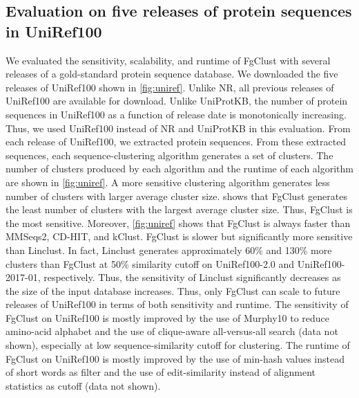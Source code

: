 \documentclass[11pt,letterpaper]{article}
\begin{document}
\subsection{Evaluation on five releases of protein sequences in UniRef100}

We evaluated the sensitivity, scalability, and runtime of FgClust with several releases of a gold-standard protein sequence database.
We downloaded the five releases of UniRef100 \citep{suzek2007uniref} shown in \cref{fig:uniref}.
Unlike NR, all previous releases of UniRef100 are available for download.
Unlike UniProtKB, the number of protein sequences in UniRef100 as a function of release date is monotonically increasing.
Thus, we used UniRef100 instead of NR and UniProtKB in this evaluation.
From each release of UniRef100, we extracted protein sequences.
From these extracted sequences, each sequence-clustering algorithm generates a set of clusters.
The number of clusters produced by each algorithm and the runtime of each algorithm are shown in \cref{fig:uniref}.
A more sensitive clustering algorithm generates less number of clusters with larger average cluster size.
 shows that FgClust generates the least number of clusters with the largest average cluster size.
Thus, FgClust is the most sensitive.
Moreover, \cref{fig:uniref} shows that FgClust is always faster than MMSeqs2, CD-HIT, and kClust.
FgClust is slower but significantly more sensitive than Linclust.
In fact, Linclust generates approximately 60\% and 130\% more clusters than FgClust at 50\% similarity cutoff on UniRef100-2.0 and UniRef100-2017-01, respectively.
Thus, the sensitivity of Linclust significantly decreases as the size of the input database increases. 
Thus, only FgClust can scale to future releases of UniRef100 in terms of both sensitivity and runtime.
The sensitivity of FgClust on UniRef100 
is mostly improved by the use of Murphy10 to reduce amino-acid alphabet and the use of clique-aware all-versus-all search (data not shown), especially at low sequence-similarity cutoff for clustering.
The runtime of FgClust on UniRef100 is mostly improved by the use of min-hash values instead of short words as filter and the use of edit-similarity instead of alignment statistics as cutoff (data not shown).
\end{document}
